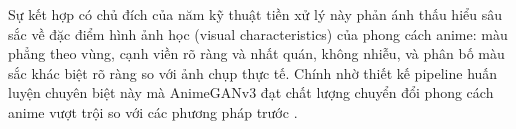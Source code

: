 Sự kết hợp có chủ đích của năm kỹ thuật tiền xử lý này phản ánh thấu hiểu sâu sắc về
đặc điểm hình ảnh học (visual characteristics) của phong cách anime: màu phẳng theo vùng,
cạnh viền rõ ràng và nhất quán, không nhiễu, và phân bố màu sắc khác biệt rõ ràng so với
ảnh chụp thực tế. Chính nhờ thiết kế pipeline huấn luyện chuyên biệt này mà AnimeGANv3
đạt chất lượng chuyển đổi phong cách anime vượt trội so với các phương pháp trước
\cite{Liu2024, He2013GuidedFilter, Xu2011L0, Felzenszwalb2004, Buades2005NLM, Chen2018CartoonGAN}.





















